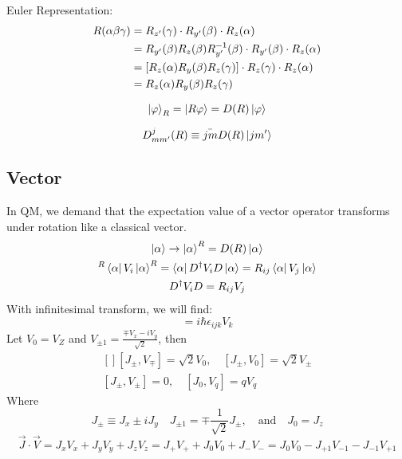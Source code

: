 Euler Representation:
\begin{equation}
    \begin{aligned}
    R(\alpha\beta\gamma) &= R_{z'}(\gamma)\cdot R_{y'}(\beta)\cdot R_{z}(\alpha)	\\
	    &= R_{y'}(\beta)R_z(\beta)R_{y'}^{-1}(\beta)\cdot R_{y'}(\beta)\cdot R_z(\alpha)	\\
	    &= [R_{z}(\alpha)R_y(\beta)R_{z}(\gamma)]\cdot R_{z}(\gamma)\cdot R_z(\alpha)	\\
	    &= R_z(\alpha)R_y(\beta)R_z(\gamma)	\\
    \end{aligned}
\end{equation}

\begin{equation}
    \ket{\varphi}_R = \ket{R\varphi} = D(R)\ket{\varphi}
\end{equation}

\begin{equation}
    D^{j}_{mm'}(R) \equiv \bar{jm}D(R)\ket{jm'}
\end{equation}

\subsection{Vector}
In QM, we demand that the expectation value of a vector operator transforms
under rotation like a classical vector.
\begin{gather*}
    \ket{\alpha}\rightarrow\ket{\alpha}^R=D(R)\ket{\alpha}\\
    ^{R}\bra{\alpha}V_i\ket{\alpha}^R=\bra{\alpha}D^{\dag}V_{i}D\ket{\alpha}=R_{ij}\bra{\alpha}V_j\ket{\alpha}\\
    D^{\dag}V_{i}D=R_{ij}V_j
\end{gather*}
With infinitesimal transform, we will find:
\begin{equation}
    [J_i,V_j]=i\hbar\epsilon_{ijk}V_k
\end{equation}
Let $V_0 = V_Z$ and $V_{\pm 1} = \frac{\mp V_x -iV_y}{\sqrt{2}}$, 
then
\[
    \begin{aligned}[]
	[J_\pm, V_\mp] = \sqrt{2}V_0 , \quad [J_\pm, V_0] = \sqrt{2}V_\pm \\
	[J_\pm, V_\pm] = 0, \quad [J_0, V_q] = qV_q
    \end{aligned}
\]
Where
\begin{equation}
    J_\pm \equiv J_x \pm iJ_y	\quad J_{\pm 1} = \mp \frac{1}{\sqrt{2}}J_\pm, \quad \text{and} \quad J_0 = J_z
\end{equation}
\begin{equation}
    \vec{J}\cdot\vec{V} = J_xV_x + J_yV_y + J_zV_z = J_+V_+ + J_0V_0 + J_-V_- = J_0V_0 - J_{+1}V_{-1} - J_{-1}V_{+1}
\end{equation}

